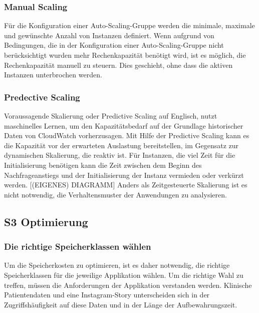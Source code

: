 \subsubsection{Manual Scaling}
Für die Konfiguration einer Auto-Scaling-Gruppe werden die minimale, maximale und gewünschte Anzahl von Instanzen definiert. Wenn aufgrund von Bedingungen, die in der Konfiguration einer Auto-Scaling-Gruppe nicht berücksichtigt wurden mehr Rechenkapazität benötigt wird, ist es möglich, die Rechenkapazität manuell zu steuern. Dies geschieht, ohne dass die aktiven Instanzen unterbrochen werden.

\subsubsection{Predective Scaling}%
Voraussagende Skalierung oder Predictive Scaling auf Englisch, nutzt maschinelles Lernen, um den Kapazitätsbedarf auf der Grundlage historischer Daten von CloudWatch vorherzusagen. Mit Hilfe der Predictive Scaling kann es die Kapazität vor der erwarteten Auslastung bereitstellen, im Gegensatz zur dynamischen Skalierung, die reaktiv ist. 
Für Instanzen, die viel Zeit für die Initialisierung benötigen kann die Zeit zwischen dem Beginn des Nachfrageanstiegs und der Initialisierung der Instanz vermieden oder verkürzt werden.
[(EIGENES) DIAGRAMM]
Anders als Zeitgesteuerte Skalierung ist es nicht notwendig, die Verhaltensmuster der Anwendungen zu analysieren.

\subsection{S3 Optimierung}
\subsubsection{Die richtige Speicherklassen wählen}
Um die Speicherkosten zu optimieren, ist es daher notwendig, die richtige Speicherklassen für die jeweilige Applikation wählen. Um die richtige Wahl zu treffen, müssen die Anforderungen der Applikation verstanden werden. Klinische Patientendaten und eine Instagram-Story unterscheiden sich in der Zugriffshäufigkeit auf diese Daten und in der Länge der Aufbewahrungszeit.

